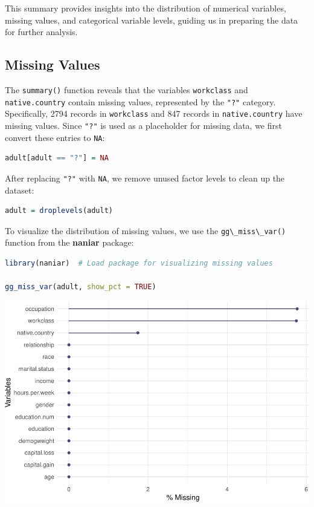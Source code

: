 \documentclass[
]{book}
\newcommand{\passthrough}[1]{#1}
\theoremstyle{definition}
\theoremstyle{definition}
\theoremstyle{definition}
\theoremstyle{definition}
\theoremstyle{remark}
\begin{document}
This summary provides insights into the distribution of numerical variables, missing values, and categorical variable levels, guiding us in preparing the data for further analysis.

\subsection{Missing Values}\label{missing-values-1}

The \passthrough{\lstinline!summary()!} function reveals that the variables \passthrough{\lstinline!workclass!} and \passthrough{\lstinline!native.country!} contain missing values, represented by the \passthrough{\lstinline!"?"!} category. Specifically, 2794 records in \passthrough{\lstinline!workclass!} and 847 records in \passthrough{\lstinline!native.country!} have missing values. Since \passthrough{\lstinline!"?"!} is used as a placeholder for missing data, we first convert these entries to \passthrough{\lstinline!NA!}:

\begin{lstlisting}[language=R]
adult[adult == "?"] = NA
\end{lstlisting}

After replacing \passthrough{\lstinline!"?"!} with \passthrough{\lstinline!NA!}, we remove unused factor levels to clean up the dataset:

\begin{lstlisting}[language=R]
adult = droplevels(adult)
\end{lstlisting}

To visualize the distribution of missing values, we use the \passthrough{\lstinline!gg\_miss\_var()!} function from the \textbf{naniar} package:

\begin{lstlisting}[language=R]
library(naniar)  # Load package for visualizing missing values

gg_miss_var(adult, show_pct = TRUE)
\end{lstlisting}

\begin{center}\includegraphics[width=0.7\linewidth]{data-preparation_files/figure-latex/unnamed-chunk-18-1} \end{center}
\end{document}

